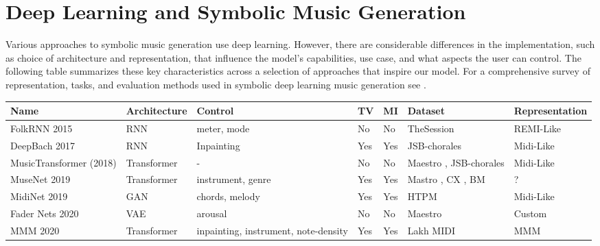 \section{Deep Learning and Symbolic Music Generation}
Various approaches to symbolic music generation use deep learning. However, there are considerable differences in the implementation, such as choice of architecture and representation, that influence the model's capabilities, use case, and what aspects the user can control. The following table summarizes these key characteristics across a selection of approaches that inspire our model. For a comprehensive survey of representation, tasks, and evaluation methods used in symbolic deep learning music generation see \cite{Ji_Yang_Luo_survey_symbolic_2024}.

\begin{table}[H] \label{table:bigtable}
    \centering
    \renewcommand{\arraystretch}{1.2} %
    \setlength{\tabcolsep}{3pt} %
    \scriptsize %
    \begin{tabular}{|p{2.5cm}|p{1.8cm}|p{3cm}|p{1cm}|p{1cm}|p{3cm}|p{2.5cm}|}
        \hline
        \textbf{Name} & \textbf{Architecture} & \textbf{Control} & \textbf{TV} & \textbf{MI} & \textbf{Dataset} & \textbf{Representation} \\
        \hline
        FolkRNN 2015 \cite{Sturm_Ben-Tal_2016} & RNN & meter, mode & No & No & TheSession \cite{sessionfolkdata} & REMI-Like\\
        DeepBach 2017 \cite{Hadjeres_Pachet_Nielsen_2017} & RNN & Inpainting & Yes & Yes & JSB-chorales \cite{jsbchorales} & Midi-Like\\ 
        MusicTransformer (2018) \cite{Huang_Vaswani_Uszkoreit_Shazeer_Simon_Hawthorne_Dai_Hoffman_Dinculescu_Eck_2018} & Transformer & - & No & No & Maestro \cite{hawthorne2018maestro},  JSB-chorales\cite{jsbchorales} & Midi-Like\\
        MuseNet 2019 \cite{Christine_2019} & Transformer & instrument, genre & Yes & Yes & Mastro \cite{hawthorne2018maestro}, CX \cite{classicalarchives}, BM \cite{bitmidi} & ?\\
        MidiNet 2019 \cite{midinet} & GAN & chords, melody & Yes & Yes & HTPM \cite{hooktheorypopmidi} & Midi-Like\\
        Fader Nets 2020\cite{Tan_Herremans_2020} & VAE & arousal & No & No & Maestro \cite{hawthorne2018maestro} & Custom \\
        MMM 2020 \cite{Ens_Pasquier_2020_MMM} & Transformer & inpainting, instrument, note-density & Yes & Yes & Lakh MIDI \cite{Raffel_2016} & MMM\\

\end{tabular}
\end{table}
